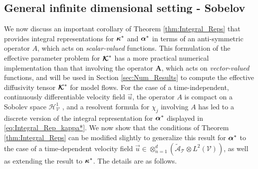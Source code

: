 \documentclass[11pt]{amsart}
\newcommand{\Ab}{\mathbf{A}}
\newcommand\Kbc{\mbox{\boldmath${\mathcal{K}}$}}
\newcommand{\Tc}{\mathcal{T}}
\newcommand{\Vc}{\mathcal{V}}
\newcommand{\Hc}{\mathcal{H}}
\newcommand{\As}{\mathscr{A}}
\newcommand\balpha{\mbox{\boldmath${\alpha}$}}
\newcommand\bkappa{\mbox{\boldmath${\kappa}$}}
\begin{document}
\subsection{General infinite dimensional setting - Sobelov}
\label{sec:Integral_Rep_General_Sobelov}
%
We now discuss an important corollary of Theorem
\ref{thm:Integral_Reps} that provides integral
representations for $\bkappa^*$ and $\balpha^*$ in terms of an
anti-symmetric operator $A$, which acts on \emph{scalar-valued}
functions. This formulation
\cite{Pavliotis:PHD_Thesis,Bhattacharya:AAP:1999:951} of the effective
parameter problem for $\Kbc^*$ has a more practical numerical
implementation than that involving the operator $\Ab$, which acts on
\emph{vector-valued} functions, and will be used in Section
\ref{sec:Num_Results} to compute the effective diffusivity tensor
$\Kbc^*$ for model flows. For the case of a time-independent,
continuously differentiable velocity field
$\vec{u}$, the operator $A$ is compact on a Sobolev space $\Hc^1_{\Vc}$
\cite{Bhattacharya:AAP:1999:951}, and a resolvent formula for $\chi_j$
involving $A$ has led to \cite{Pavliotis:PHD_Thesis} a discrete 
version of the integral representation for $\balpha^*$ displayed in 
\eqref{eq:Integral_Rep_kappa*}. We now show that the conditions of
Theorem \ref{thm:Integral_Reps} can be modified slightly to generalize
this result for $\balpha^*$ to the case of a time-dependent velocity
field $\vec{u}\in\otimes_{n=1}^d(\tilde{\As}_{\Tc}\otimes L^2(\Vc))$, as well as
extending the result to $\bkappa^*$. The details are as follows.     
\end{document}
